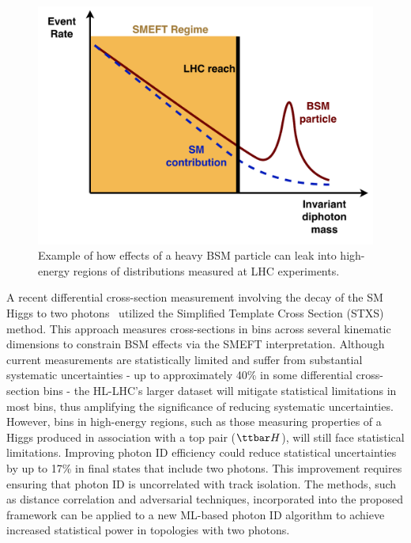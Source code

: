 \documentclass[letter, USenglish, 11pt, subfigure]{article}
\newcommand{\tth}{\ensuremath{\ttbar H}}
\begin{document}
\begin{figure}
  \centering
  \includegraphics[width=\linewidth]{figures/SMEFT.pdf}
  \caption{\label{fig:SMEFT_highmass} Example of how effects of a heavy BSM particle can leak into high-energy regions of distributions measured at LHC experiments.}
\end{figure}

A recent differential cross-section measurement involving the decay of the SM Higgs to two photons~\cite{ATLAS_STXS} utilized the Simplified Template Cross Section (STXS) method. This approach measures cross-sections in bins across several kinematic dimensions to constrain BSM effects via the SMEFT interpretation. Although current measurements are statistically limited and suffer from substantial systematic uncertainties - up to approximately 40\% in some differential cross-section bins - the HL-LHC's larger dataset will mitigate statistical limitations in most bins, thus amplifying the significance of reducing systematic uncertainties. However, bins in high-energy regions, such as those measuring properties of a Higgs produced in association with a top pair (\tth), will still face statistical limitations. Improving photon ID efficiency could reduce statistical uncertainties by up to 17\% in final states that include two photons. This improvement requires ensuring that photon ID is uncorrelated with track isolation. The methods, such as distance correlation and adversarial techniques, incorporated into the proposed framework can be applied to a new ML-based photon ID algorithm to achieve increased statistical power in topologies with two photons.
\end{document}
